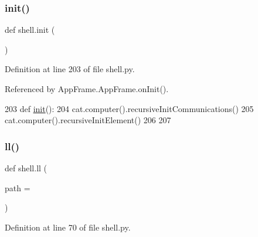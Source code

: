 \subsubsection{\texorpdfstring{init()}{init()}}
{\footnotesize\ttfamily def shell.\+init (\begin{DoxyParamCaption}{ }\end{DoxyParamCaption})}



Definition at line 203 of file shell.\+py.



Referenced by App\+Frame.\+App\+Frame.\+on\+Init().


\begin{DoxyCode}
203 \textcolor{keyword}{def }\hyperlink{namespaceshell_aa0929fa150d13168df6061f9d51b727b}{init}():
204   cat.computer().recursiveInitCommunications()
205   cat.computer().recursiveInitElement()
206 
207 
\end{DoxyCode}
\mbox{\label{namespaceshell_a739d025c0779dd20066ec2f61b0513aa}} 
\subsubsection{\texorpdfstring{ll()}{ll()}}
{\footnotesize\ttfamily def shell.\+ll (\begin{DoxyParamCaption}\item[{}]{path = {\ttfamily \textquotesingle{}\textquotesingle{}} }\end{DoxyParamCaption})}



Definition at line 70 of file shell.\+py.


